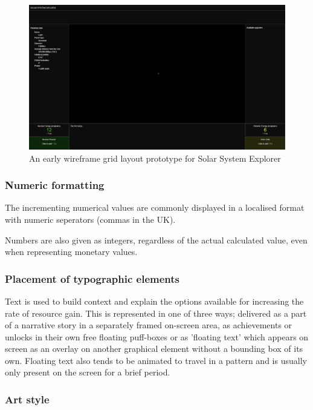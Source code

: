 \documentclass[twoside]{bhamthesis}
\begin{document}
\begin{figure}[h!]
  \includegraphics[width=\linewidth]{images/grid_layout.png}
  \caption{An early wireframe grid layout prototype for Solar System Explorer}
  \label{fig:grid_layout}
\end{figure}

\subsubsection{Numeric formatting}

The incrementing numerical values are commonly displayed in a localised format with numeric seperators (commas in the UK).

Numbers are also given as integers, regardless of the actual calculated value, even when representing monetary values.



\subsubsection{Placement of typographic elements}

Text is used to build context and explain the options available for increasing the rate of resource gain. This is represented in one of three ways; delivered as a part of a narrative story in a separately framed on-screen area, as achievements or unlocks in their own free floating puff-boxes or as 'floating text' which appears on screen as an overlay on another graphical element without a bounding box of its own. Floating text also tends to be animated to travel in a pattern and is usually only present on the screen for a brief period.

\subsubsection{Art style}
\end{document}
